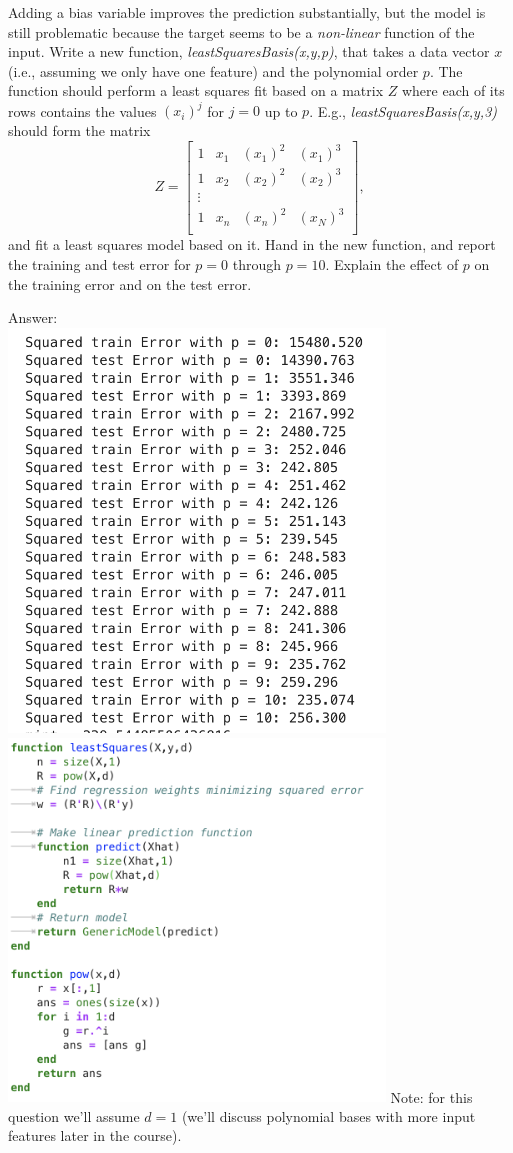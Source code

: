 \documentclass{article}
\def\ans#1{\par\gre{Answer: #1}}
\def\blu#1{{\color{blu}#1}}
\def\gre#1{{\color{gre}#1}}
\begin{document}
Adding a bias variable improves the prediction substantially, but the model is still problematic because the target seems to be a \emph{non-linear} function of the input. Write a new function, \emph{leastSquaresBasis(x,y,p)}, that takes a data vector $x$ (i.e., assuming we only have one feature) and the polynomial order $p$. The function should perform a least squares fit based on a matrix $Z$ where each of its rows contains the values $(x_{i})^j$ for $j=0$ up to $p$. E.g., \emph{leastSquaresBasis(x,y,3)} should form the matrix
\[
Z = 
\left[\begin{array}{cccc}
1 & x_1 & (x_1)^2 & (x_1)^3\\
1 & x_2 & (x_2)^2 & (x_2)^3\\
\vdots\\
1 & x_n & (x_n)^2 & (x_N)^3\\
\end{array}
\right],
\]
and fit a least squares model based on it.
\blu{Hand in the new function, and report the training and test error for $p = 0$ through $p= 10$. Explain the effect of $p$ on the training error and on the test error.}
\ans{
    \\ \includegraphics[width=10cm]{Q32NewNew.PNG}
    \\ \includegraphics[width = 10cm]{Q32NewCode.PNG}
}
Note: for this question we'll assume $d=1$ (we'll discuss polynomial bases with more input features later in the course).
\end{document}
